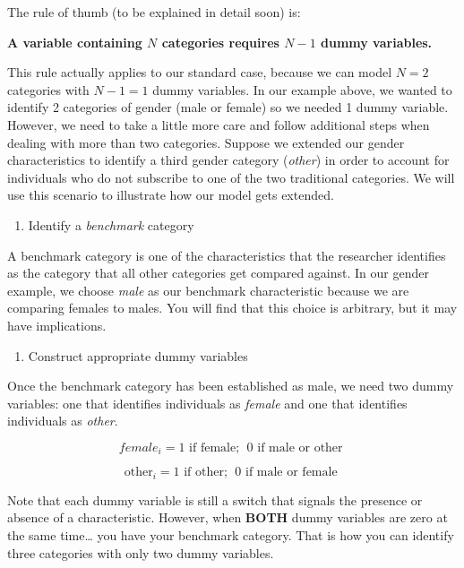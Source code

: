 \documentclass[
]{book}
\providecommand{\tightlist}{%
  \setlength{\itemsep}{0pt}\setlength{\parskip}{0pt}}
\begin{document}
The rule of thumb (to be explained in detail soon) is:

\textbf{A variable containing \(N\) categories requires \(N-1\) dummy variables.}

This rule actually applies to our standard case, because we can model \(N=2\) categories with \(N-1=1\) dummy variables. In our example above, we wanted to identify 2 categories of gender (male or female) so we needed 1 dummy variable. However, we need to take a little more care and follow additional steps when dealing with more than two categories. Suppose we extended our gender characteristics to identify a third gender category (\emph{other}) in order to account for individuals who do not subscribe to one of the two traditional categories. We will use this scenario to illustrate how our model gets extended.

\begin{enumerate}
\def\labelenumi{\arabic{enumi}.}
\tightlist
\item
  Identify a \emph{benchmark} category
\end{enumerate}

A benchmark category is one of the characteristics that the researcher identifies as the category that all other categories get compared against. In our gender example, we choose \emph{male} as our benchmark characteristic because we are comparing females to males. You will find that this choice is arbitrary, but it may have implications.

\begin{enumerate}
\def\labelenumi{\arabic{enumi}.}
\setcounter{enumi}{1}
\tightlist
\item
  Construct appropriate dummy variables
\end{enumerate}

Once the benchmark category has been established as male, we need two dummy variables: one that identifies individuals as \emph{female} and one that identifies individuals as \emph{other}.

\[female_i = 1 \mbox{ if female; }\; 0 \mbox{ if male or other }\]

\[\mbox{other}_i = 1 \mbox{ if other; }\;  0 \mbox{ if male or female }\]

Note that each dummy variable is still a switch that signals the presence or absence of a characteristic. However, when \textbf{BOTH} dummy variables are zero at the same time\ldots{} you have your benchmark category. That is how you can identify three categories with only two dummy variables.
\end{document}
